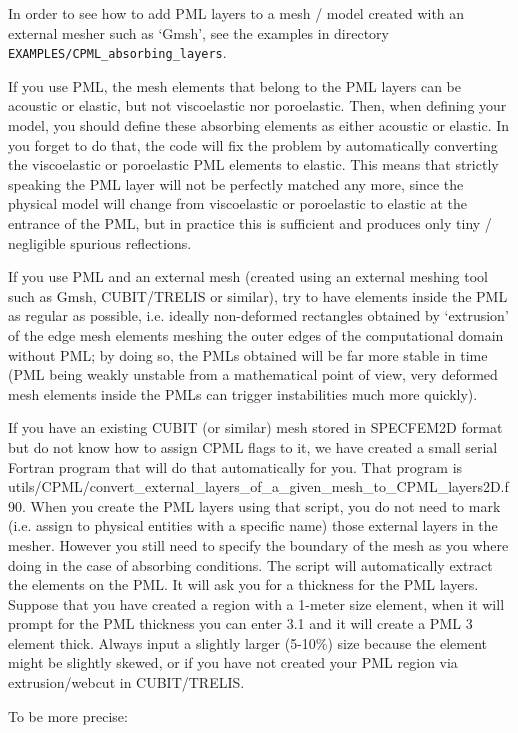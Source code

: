\documentclass[oneside,english,onecolumn,letterpaper]{book}
\begin{document}
In order to see how to add PML layers to a mesh / model created with an external mesher such as `Gmsh', see the examples in directory
\texttt{EXAMPLES/CPML\_absorbing\_layers}.

If you use PML, the mesh elements that belong to the PML layers can be acoustic or elastic, but not viscoelastic nor poroelastic.
Then, when defining your model, you should define these absorbing elements as either acoustic or elastic.
In you forget to do that, the code will fix the problem by automatically converting the viscoelastic or poroelastic PML
elements to elastic. This means that strictly speaking the PML layer will not be perfectly matched any more, since the physical
model will change from viscoelastic or poroelastic to elastic at the entrance of the PML, but in practice this is sufficient and
produces only tiny / negligible spurious reflections.

If you use PML and an external mesh (created using an external meshing tool
such as Gmsh, CUBIT/TRELIS or similar), try to have elements inside the PML as regular as possible,
i.e. ideally non-deformed rectangles obtained by `extrusion' of the edge mesh elements meshing the
outer edges of the computational domain without PML; by doing so, the PMLs obtained will be far more stable
in time (PML being weakly unstable from a mathematical point of view, very deformed mesh elements
inside the PMLs can trigger instabilities much more quickly).

If you have an existing CUBIT (or similar) mesh stored in SPECFEM2D
format but do not know how to assign CPML flags to it,
we have created a small serial Fortran program that will do that automatically for you.
That program is utils/CPML/convert\_external\_layers\_of\_a\_given\_mesh\_to\_CPML\_layers2D.f90.
When you create the PML layers using that script, you do not need to mark
(i.e. assign to physical entities with a specific name) those external layers in the mesher.
However you still need to specify the boundary of the mesh as you where doing in the case of absorbing conditions.
The script will automatically extract the elements on the PML. It will ask you for a thickness for the PML layers.
Suppose that you have created a region with a 1-meter size element, when it will prompt for the PML thickness
you can enter 3.1 and it will create a PML 3 element thick. Always input a slightly larger (5-10\%) size because the element might be slightly skewed,
or if you have not created your PML region via extrusion/webcut in CUBIT/TRELIS.

To be more precise:
\end{document}
